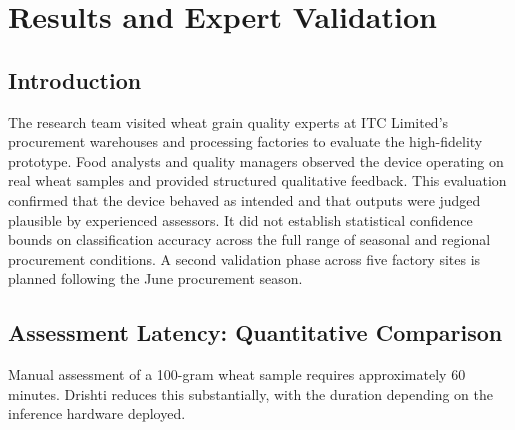 
\chapter{Results and Expert Validation}\doublespacing
\label{Chapter8}

\section{Introduction}


The research team visited wheat grain quality experts at ITC Limited's procurement warehouses and processing factories to evaluate the high-fidelity prototype. Food analysts and quality managers observed the device operating on real wheat samples and provided structured qualitative feedback. This evaluation confirmed that the device behaved as intended and that outputs were judged plausible by experienced assessors. It did not establish statistical confidence bounds on classification accuracy across the full range of seasonal and regional procurement conditions. A second validation phase across five factory sites is planned following the June procurement season.

\section{Assessment Latency: Quantitative Comparison}

Manual assessment of a 100-gram wheat sample requires approximately 60 minutes. Drishti reduces this substantially, with the duration depending on the inference hardware deployed.

